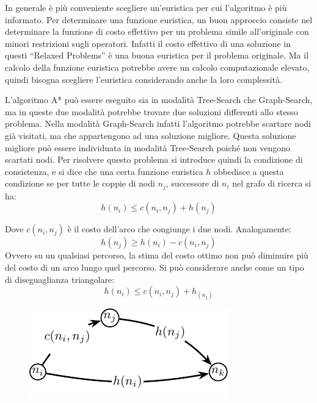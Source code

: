 \documentclass{article}
\numberwithin{equation}{subsection}
\begin{document}

In generale è più conveniente scegliere un'euristica per cui l'algoritmo è più informato. Per determinare una funzione euristica, un buon approccio consiste nel 
determinare la funzione di costo effettivo per un problema simile all'originale con minori restrizioni sugli operatori. Infatti il costo effettivo di una soluzione 
in questi ``Relaxed Problems'' è una buona euristica per il problema originale. Ma il calcolo della funzione euristica potrebbe avere un calcolo computazionale 
elevato, quindi bisogna scegliere l'euristica considerando anche la loro complessità.  

L'algoritmo A* può essere eseguito sia in modalità Tree-Search che Graph-Search, ma in queste due modalità potrebbe trovare due soluzioni differenti allo stesso 
problema. 
Nella modalità Graph-Search infatti l'algoritmo potrebbe scartare nodi già visitati, ma che appartengono ad una soluzione migliore. Questa soluzione migliore può essere individuata in modalità Tree-Search poiché non 
vengono scartati nodi. Per risolvere questo problema si introduce quindi la condizione di consistenza, e si dice che una certa funzione euristica $h$ 
obbedisce a questa condizione se per tutte le coppie di nodi $n_j$, successore di $n_i$ nel grafo di 
ricerca si ha:
\begin{equation}
    h(n_i)\leq c(n_i,n_j)+h(n_j)
\end{equation}

Dove $c(n_i,n_j)$ è il costo dell'arco che congiunge i due nodi. 
Analogamente:
\begin{equation*}
    h(n_j)\geq h(n_i)-c(n_i,n_j)
\end{equation*}
Ovvero su un qualsiasi percorso, la stima del costo ottimo non può diminuire più del costo di un arco 
lungo quel percorso. Si può considerare anche come un tipo di diseguaglianza triangolare:
\begin{equation*}
    h(n_i)\leq c(n_i,n_j)+h_(n_j)
\end{equation*}

\begin{figure}[H]
    \centering%
    \includegraphics{disuguaglianza_consistenza.pdf}%
\end{figure}
\end{document}
